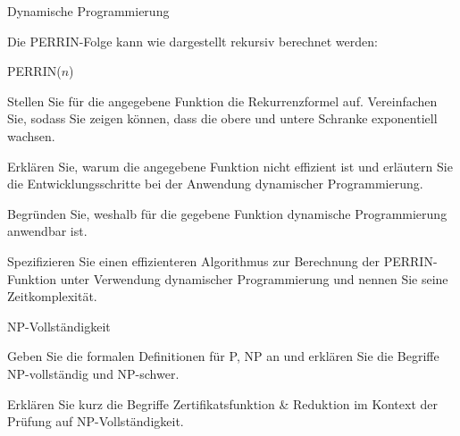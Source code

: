 \documentclass{exercisesheet}
\begin{document}
\begin{eexercises}{Dynamische Programmierung}{
    Die PERRIN-Folge kann wie dargestellt rekursiv berechnet werden:
    \begin{algorithm}[ht]
      \caption{PERRIN($n$)}
    \end{algorithm}
  }
  \item Stellen Sie für die angegebene Funktion die Rekurrenzformel auf. Vereinfachen Sie, sodass Sie zeigen können, dass die obere und untere Schranke exponentiell wachsen.
  \item Erklären Sie, warum die angegebene Funktion nicht effizient ist und erläutern Sie die Entwicklungsschritte bei der Anwendung dynamischer Programmierung.
  \item Begründen Sie, weshalb für die gegebene Funktion dynamische Programmierung anwendbar ist.
  \item Spezifizieren Sie einen effizienteren Algorithmus zur Berechnung der PERRIN-Funktion unter Verwendung dynamischer Programmierung und nennen Sie seine Zeitkomplexität.
\end{eexercises}

\begin{exercises}{NP-Vollständigkeit}
\item Geben Sie die formalen Definitionen für P, NP an und erklären Sie die Begriffe NP-vollständig und NP-schwer.
\item Erklären Sie kurz die Begriffe Zertifikatsfunktion \& Reduktion im Kontext der Prüfung auf NP-Vollständigkeit.
\end{exercises}
\end{document}
